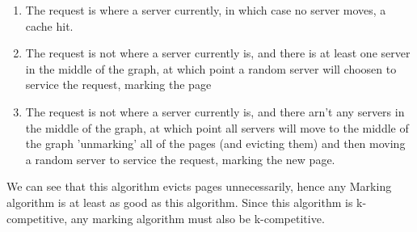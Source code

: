 \documentclass[a4paper]{article}
\begin{document}
\begin{enumerate}
		\item The request is where a server currently, in which case no server moves, a cache hit.
		\item The request is not where a server currently is, and there is at least one server in the middle of the graph, at which point a random server will
			choosen to service the request, marking the page
		\item The request is not where a server currently is, and there arn't any servers in the middle of the graph, at which point all servers will move
			to the middle of the graph 'unmarking' all of the pages (and evicting them) and then moving a random server to service the request, marking the new page.
\end{enumerate}

We can see that this algorithm evicts pages unnecessarily, hence any Marking algorithm is at least as good as this algorithm. Since this 
algorithm is k-competitive, any marking algorithm must also be k-competitive.
\end{document}
